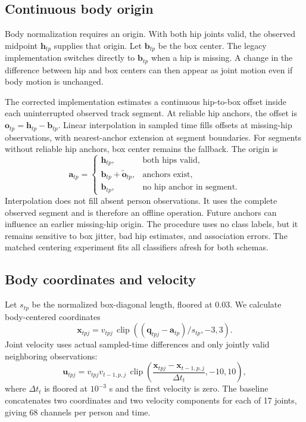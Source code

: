 \documentclass[journal]{IEEEtai}
\begin{document}
\subsection{Continuous body origin}
Body normalization requires an origin. With both hip joints valid, the observed midpoint $\mathbf{h}_{tp}$ supplies that origin. Let $\mathbf{b}_{tp}$ be the box center. The legacy implementation switches directly to $\mathbf{b}_{tp}$ when a hip is missing. A change in the difference between hip and box centers can then appear as joint motion even if body motion is unchanged.

The corrected implementation estimates a continuous hip-to-box offset inside each uninterrupted observed track segment. At reliable hip anchors, the offset is $\mathbf{o}_{tp}=\mathbf{h}_{tp}-\mathbf{b}_{tp}$. Linear interpolation in sampled time fills offsets at missing-hip observations, with nearest-anchor extension at segment boundaries. For segments without reliable hip anchors, box center remains the fallback. The origin is
\begin{equation}
\mathbf{a}_{tp}=
\begin{cases}
\mathbf{h}_{tp}, & \text{both hips valid},\\
\mathbf{b}_{tp}+\widetilde{\mathbf{o}}_{tp}, & \text{anchors exist},\\
\mathbf{b}_{tp}, & \text{no hip anchor in segment}.
\end{cases}
\label{eq:center}
\end{equation}
Interpolation does not fill absent person observations. It uses the complete observed segment and is therefore an offline operation. Future anchors can influence an earlier missing-hip origin. The procedure uses no class labels, but it remains sensitive to box jitter, bad hip estimates, and association errors. The matched centering experiment fits all classifiers afresh for both schemas.

\subsection{Body coordinates and velocity}
Let $s_{tp}$ be the normalized box-diagonal length, floored at 0.03. We calculate body-centered coordinates
\begin{equation}
\mathbf{x}_{tpj}=v_{tpj}\,\operatorname{clip}
\left((\mathbf{q}_{tpj}-\mathbf{a}_{tp})/s_{tp},-3,3\right).
\end{equation}
Joint velocity uses actual sampled-time differences and only jointly valid neighboring observations:
\begin{equation}
\mathbf{u}_{tpj}=v_{tpj}v_{t-1,p,j}\,
\operatorname{clip}\left(
\frac{\mathbf{x}_{tpj}-\mathbf{x}_{t-1,p,j}}{\Delta t_t},-10,10\right),
\label{eq:velocity}
\end{equation}
where $\Delta t_t$ is floored at $10^{-3}$ s and the first velocity is zero. The baseline concatenates two coordinates and two velocity components for each of 17 joints, giving 68 channels per person and time.
\end{document}
